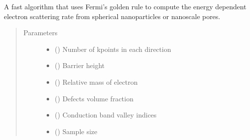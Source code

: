 \documentclass[letterpaper,10pt,english]{sphinxmanual}
\begin{document}
\begin{fulllineitems}
\label{\detokenize{autosummary/ThermoElectric.tau3D_spherical:ThermoElectric.tau3D_spherical}}
\sphinxAtStartPar
A fast algorithm that uses Fermi’s golden rule to compute the energy dependent electron scattering rate
from spherical nano\sphinxhyphen{}particles or nano\sphinxhyphen{}scale pores.
\begin{quote}\begin{description}
\item[{Parameters}] \leavevmode\begin{itemize}
\item {} 
\sphinxAtStartPar
{} () \textendash{} Number of kpoints in each direction

\item {} 
\sphinxAtStartPar
{} () \textendash{} Barrier height

\item {} 
\sphinxAtStartPar
{} () \textendash{} Relative mass of electron

\item {} 
\sphinxAtStartPar
{} () \textendash{} Defects volume fraction

\item {} 
\sphinxAtStartPar
{} () \textendash{} Conduction band valley indices

\item {} 
\sphinxAtStartPar
{} () \textendash{} Sample size


\end{itemize}
\end{description}
\end{quote}
\end{fulllineitems}
\end{document}
